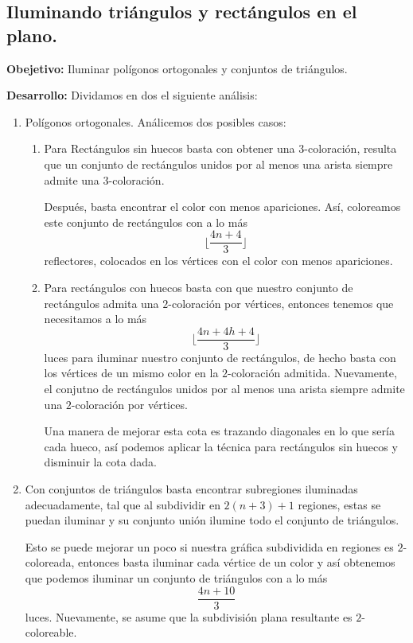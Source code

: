 \subsection[Expositor: Raúl Nuño Valdés.]{Iluminando triángulos y rectángulos en el plano.}
\textbf{Obejetivo:} Iluminar polígonos ortogonales y conjuntos de triángulos.\newline

\textbf{Desarrollo:} Dividamos en dos el siguiente análisis:
\begin{enumerate}
\item Polígonos ortogonales. Análicemos dos posibles casos:
  \begin{enumerate}
  \item Para Rectángulos sin huecos basta con obtener una $3$-coloración, resulta que
    un conjunto de rectángulos unidos por al menos una arista siempre admite una $3$-coloración.\newline

    Después, basta encontrar el color con menos apariciones. Así, coloreamos este conjunto de rectángulos
    con a lo más
    \[\lfloor \frac{4n + 4}{3} \rfloor\]
    reflectores, colocados en los vértices con el color con menos apariciones.
  \item Para rectángulos con huecos basta con que nuestro conjunto de rectángulos admita
    una $2$-coloración por vértices, entonces tenemos que necesitamos a lo más
    \[\lfloor \frac{4n + 4h + 4}{3} \rfloor\]
    luces para iluminar nuestro conjunto de rectángulos, de hecho basta con los vértices de
    un mismo color en la $2$-coloración admitida. Nuevamente, el conjutno de rectángulos unidos
    por al menos una arista siempre admite una $2$-coloración por vértices.\newline

    Una manera de mejorar esta cota es trazando diagonales en lo que sería cada hueco, así
    podemos aplicar la técnica para rectángulos sin huecos y disminuir la cota dada.
  \end{enumerate}
\item Con conjuntos de triángulos basta encontrar subregiones iluminadas adecuadamente,
  tal que al subdividir en $2(n + 3) + 1$ regiones, estas se puedan iluminar y su conjunto unión
  ilumine todo el conjunto de triángulos.\newline

  Esto se puede mejorar un poco si nuestra gráfica subdividida en regiones es $2$-coloreada, entonces
  basta iluminar cada vértice de un color y así obtenemos que podemos iluminar un conjunto de triángulos
  con a lo más
  \[\frac{4n + 10}{3}\]
  luces. Nuevamente, se asume que la subdivisión plana resultante es $2$-coloreable.
\end{enumerate}
